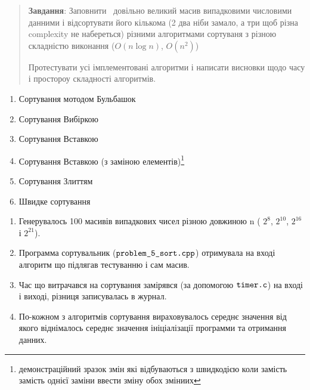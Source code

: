 \begin{center}
  \Large{}
\end{center}


\begin{center}
\end{center}

\begin{quote} \textbf{Завдання}:
Заповнити  довільно великий масив випадковими числовими данними і відсортувати його кількома (2 два ніби замало, а три щоб різна complexity не набереться) різними алгоритмами сортуваня з різною складністю виконання ($O (n \log{n})$, $O(n^2)$)

Протестувати усі імплементовані алгоритми і написати висновки щодо часу і простороу складності алгоритмів.
\end{quote}

\begin{center}
\end{center}

\begin{enumerate}
  \item Сортування мотодом Бульбашок
  \item Сортування Вибіркою
  \item Сортування Вставкою
  \item Сортування Вставкою (з заміною елементів)\footnote{демонстраційний зразок змін які відбуваються з швидкодією коли замість замість однієї заміни ввести зміну обох зміниих}
  \item Сортування Злиттям
  \item Швидке сортування
  \end{enumerate}

\begin{center}
\end{center}

\begin{enumerate}
  \item Генерувалось 100 масивів випадкових чисел різною довжиною n ( $2^8$, $2^{10}$, $2^{16}$ і $2^{21}$).
  \item Программа сортувальник ($\normalsize\texttt{problem\_5\_sort.cpp}$) отримувала на вході алгоритм що підлягав тестуванню і сам масив.
  \item Час що витрачався на сортування замірявся (за допомогою $\normalsize\texttt{timer.c}$) на вході і виході, різниця записувалась в журнал.
  \item По-кожном з алгоритмів сортування вираховувалось середнє значення від якого віднімалось середнє значення ініціалізації программи та отримання данних.
  \end{enumerate}

